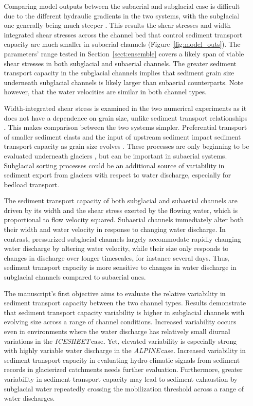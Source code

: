 \documentclass[esurf, manuscript]{copernicus}
\newcommand{\alpine}{\textit{ALPINE}\,}
\newcommand{\icesheet}{\textit{ICESHEET}\,}
\begin{document}
Comparing model outputs between the subaerial and subglacial case is difficult due to the different hydraulic gradients in the two systems, with the subglacial one generally being much steeper \citep{alley1997}.
This results the shear stresses and width-integrated shear stresses across the channel bed that control sediment transport capacity are much smaller in subaerial channels (Figure~\ref{fig:model_outs}).
The parameters' range tested in Section~\ref{sect:ensemble} covers a likely span of viable shear stresses in both subglacial and subaerial channels.
The greater sediment transport capacity in the subglacial channels implies that sediment grain size underneath subglacial channels is likely larger than subaerial counterparts.
Note however, that the water velocities are similar in both channel types.

Width-integrated shear stress is examined in the two numerical experiments as it does not have a dependence on grain size, unlike sediment transport relationships \citep[][Section \ref{sect:scaling}]{meyer1948}.
This makes comparison between the two systems simpler. 
Preferential transport of smaller sediment clasts and the input of upstream sediment impact sediment transport capacity as grain size evolves \citep[e.g.][]{gomez1983}.
These processes are only beginning to be evaluated underneath glaciers \citep{aitken2024}, but can be important in subaerial systems.
Subglacial sorting processes could be an additional source of variability in sediment export from glaciers with respect to water discharge, especially for bedload transport.

\conclusions

The sediment transport capacity of both subglacial and subaerial channels are driven by its width and the shear stress exerted by the flowing water, which is proportional to flow velocity squared.
Subaerial channels immediately alter both their width and water velocity in response to changing water discharge.
In contrast, pressurized subglacial channels largely accommodate rapidly changing water discharge by altering water velocity, while their size only responds to changes in discharge over longer timescales, for instance several days.
Thus, sediment transport capacity is more sensitive to changes in water discharge in subglacial channels compared to subaerial ones.

The manuscript's first objective aims to evaluate the relative variability in sediment transport capacity between the two channel types.
Results demonstrate that sediment transport capacity variability is higher in subglacial channels with evolving size across a range of channel conditions.
Increased variability occurs even in environments where the water discharge has relatively small diurnal variations in the \icesheet case.
Yet, elevated variability is especially strong with highly variable water discharge in the \alpine case.
Increased variability in sediment transport capacity in evaluating hydro-climatic signals from sediment records in glacierized catchments needs further evaluation.
Furthermore, greater variability in sediment transport capacity may lead to sediment exhaustion by subglacial water repeatedly crossing the mobilization threshold across a range of water discharges. 
\end{document}
